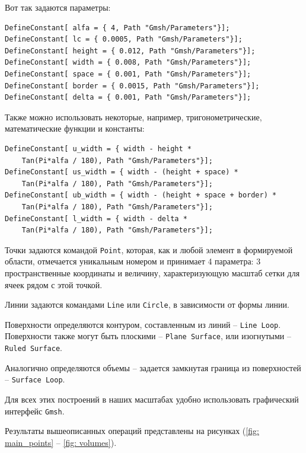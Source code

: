 \documentclass[a4paper, 14pt]{extreport}
\begin{document}
Вот так задаются параметры:
\begin{lstlisting}
DefineConstant[ alfa = { 4, Path "Gmsh/Parameters"}];
DefineConstant[ lc = { 0.0005, Path "Gmsh/Parameters"}];
DefineConstant[ height = { 0.012, Path "Gmsh/Parameters"}];
DefineConstant[ width = { 0.008, Path "Gmsh/Parameters"}];
DefineConstant[ space = { 0.001, Path "Gmsh/Parameters"}];
DefineConstant[ border = { 0.0015, Path "Gmsh/Parameters"}];
DefineConstant[ delta = { 0.001, Path "Gmsh/Parameters"}];
\end{lstlisting}

Также можно использовать некоторые, например, тригонометрические,
математические функции и константы:

\begin{lstlisting}
DefineConstant[ u_width = { width - height * 
	Tan(Pi*alfa / 180), Path "Gmsh/Parameters"}];
DefineConstant[ us_width = { width - (height + space) * 
	Tan(Pi*alfa / 180), Path "Gmsh/Parameters"}];
DefineConstant[ ub_width = { width - (height + space + border) * 
	Tan(Pi*alfa / 180), Path "Gmsh/Parameters"}];
DefineConstant[ l_width = { width - delta * 
	Tan(Pi*alfa / 180), Path "Gmsh/Parameters"}];
\end{lstlisting}

Точки задаются командой \texttt{Point}, которая, как и любой элемент в формируемой области,
отмечается уникальным номером и принимает 4 параметра: 3 пространственные 
координаты и величину, характеризующую масштаб сетки для ячеек рядом с этой точкой.

Линии задаются командами \texttt{Line} или \texttt{Circle},
в зависимости от формы линии.

Поверхности определяются контуром, составленным из
линий -- \texttt{Line Loop}. Поверхности также могут быть
плоскими -- \texttt{Plane Surface}, или изогнутыми --
\texttt{Ruled Surface}.

Аналогично определяются объемы -- задается замкнутая 
граница из поверхностей -- \texttt{Surface Loop}.

Для всех этих построений в наших масштабах удобно 
использовать графический интерфейс \texttt{Gmsh}.

Результаты вышеописанных операций представлены на рисунках 
(\ref{fig: main_points} -- \ref{fig: volumes}).
\end{document}
